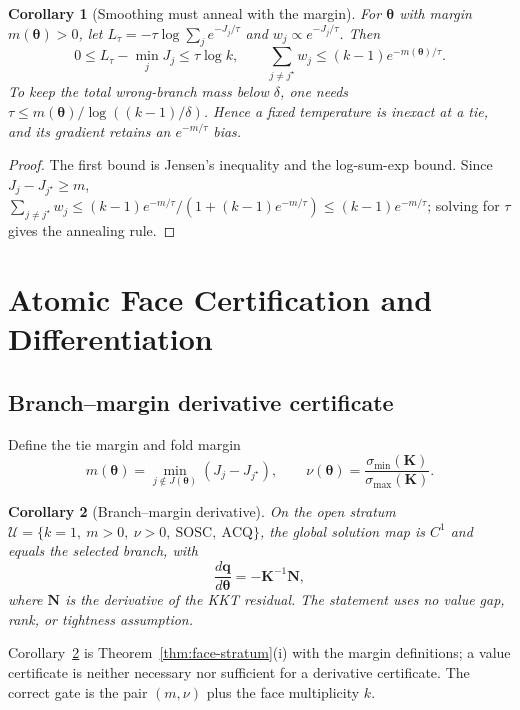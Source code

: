 \documentclass[conference]{IEEEtran}
\newtheorem{corollary}{Corollary}
\newcommand{\bq}{\bm{q}}
\newcommand{\bth}{\bm{\theta}}
\newcommand{\bK}{\bm{K}}
\newcommand{\bN}{\bm{N}}
\begin{document}
\begin{corollary}[Smoothing must anneal with the margin]
\label{cor:smoothing}
For $\bth$ with margin $m(\bth)>0$, let $L_\tau=-\tau\log\sum_j e^{-J_j/\tau}$ and $w_j\propto e^{-J_j/\tau}$. Then
\begin{equation}
0\le L_\tau-\min_j J_j\le \tau\log k,\qquad
\sum_{j\ne j^\star}w_j\le (k-1)e^{-m(\bth)/\tau}.
\label{eq:smooth}
\end{equation}
To keep the total wrong-branch mass below $\delta$, one needs $\tau\le m(\bth)/\log((k-1)/\delta)$. Hence a fixed temperature is inexact at a tie, and its gradient retains an $e^{-m/\tau}$ bias.
\end{corollary}
\begin{proof}
The first bound is Jensen's inequality and the log-sum-exp bound. Since $J_j-J_{j^\star}\ge m$, $\sum_{j\ne j^\star}w_j\le(k-1)e^{-m/\tau}/(1+(k-1)e^{-m/\tau})\le(k-1)e^{-m/\tau}$; solving for $\tau$ gives the annealing rule.
\end{proof}


\section{Atomic Face Certification and Differentiation}
\subsection{Branch--margin derivative certificate}
Define the tie margin and fold margin
\begin{equation}
m(\bth)=\min_{j\notin J(\bth)}(J_j-J_{j^\star}),\qquad
\nu(\bth)=\frac{\sigma_{\min}(\bK)}{\sigma_{\max}(\bK)}.
\label{eq:margins}
\end{equation}
\begin{corollary}[Branch--margin derivative]
\label{cor:branch-margin}
On the open stratum
$\mathcal{U}=\{k=1,\ m>0,\ \nu>0,\ \mathrm{SOSC},\ \mathrm{ACQ}\}$,
the global solution map is $C^1$ and equals the selected branch, with
\begin{equation}
\frac{d\bq}{d\bth}=-\bK^{-1}\bN,
\label{eq:ift}
\end{equation}
where $\bN$ is the derivative of the KKT residual. The statement uses no value gap, rank, or tightness assumption.
\end{corollary}
Corollary~\ref{cor:branch-margin} is Theorem~\ref{thm:face-stratum}(i) with the margin definitions; a value certificate is neither necessary nor sufficient for a derivative certificate. The correct gate is the pair $(m,\nu)$ plus the face multiplicity $k$.
\end{document}
